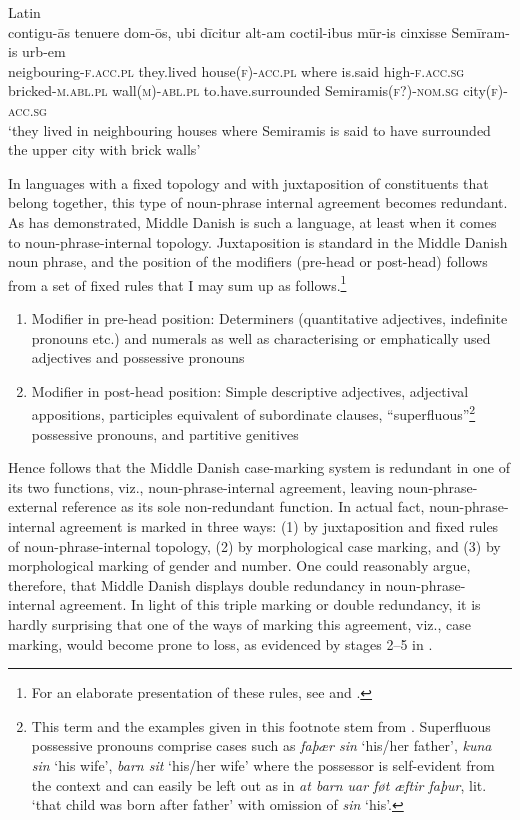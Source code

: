 \documentclass[output=paper]{langsci/langscibook}
\begin{document}
\ea\label{ex:hansen:22}
{Latin}\\
\gll contigu-ās tenuere dom-ōs, ubi dīcitur alt-am    coctil-ibus mūr-is cinxisse Semīram-is urb-em\\
     neigbouring\textsc{{}-f.acc.pl}  they.lived house\textsc{(f)-acc.pl}  where  is.said high\textsc{{}-f.acc.sg} bricked\textsc{{}-m.abl.pl} wall\textsc{(m)-abl.pl} to.have.surrounded Semiramis\textsc{(f?)-nom.sg} city\textsc{(f)-acc.sg}\\
\glt ‘they lived in neighbouring houses where Semiramis is said to have surrounded the upper city with brick walls’
\z

In languages with a fixed topology and with juxtaposition of constituents that belong together, this type of noun-phrase internal agreement becomes redundant. As \citet[93–107]{Diderichsen1941} has demonstrated, Middle Danish is such a language, at least when it comes to noun-phrase-internal topology. Juxtaposition is standard in the Middle Danish noun phrase, and the position of the modifiers (pre-head or post-head) follows from a set of fixed rules that I may sum up as follows.\footnote{For an elaborate presentation of these rules, see \citet[93–107]{Diderichsen1941} and \citet{Hansen2021}.}

\begin{enumerate}
\item Modifier in pre-head position: Determiners (quantitative adjectives, indefinite pronouns etc.) and numerals as well as characterising or emphatically used adjectives and possessive pronouns
\item Modifier in post-head position: Simple descriptive adjectives, adjectival appositions, participles equivalent of subordinate clauses, “superfluous”\footnote{This term and the examples given in this footnote stem from \citet[100, 206]{Diderichsen1941}. Superfluous possessive pronouns comprise cases such as \textit{faþær sin} ‘his/her father’, \textit{kuna sin} ‘his wife’, \textit{barn sit} ‘his/her wife’ where the possessor is self-evident from the context and can easily be left out as in \textit{at barn uar føt æftir faþur}, lit. ‘that child was born after father’ with omission of \textit{sin} ‘his’.} possessive pronouns, and partitive genitives
\end{enumerate}

Hence follows that the Middle Danish case-marking system is redundant in one of its two functions, viz., noun-phrase-internal agreement, leaving noun-phrase-external reference as its sole non-redundant function. In actual fact, noun-phrase-internal agreement is marked in three ways: (1) by juxtaposition and fixed rules of noun-phrase-internal topology, (2) by morphological case marking, and (3) by morphological marking of gender and number. One could reasonably argue, therefore, that Middle Danish displays double redundancy in noun-phrase-internal agreement. In light of this triple marking or double redundancy, it is hardly surprising that one of the ways of marking this agreement, viz., case marking, would become prone to loss, as evidenced by stages 2–5 in .
\end{document}
